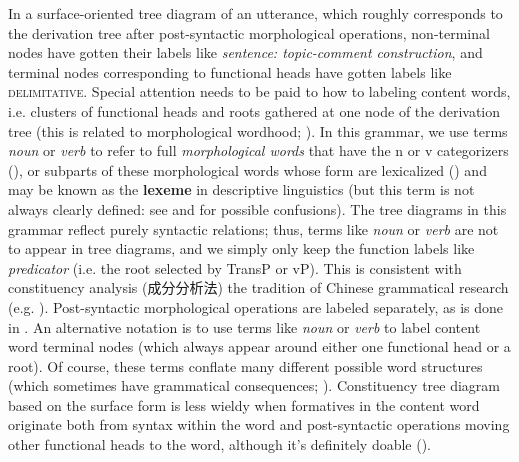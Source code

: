 \documentclass[UTF8, a4paper, oneside, scheme=plain, 12pt]{ctexrep}
\newcommand*{\citepage}[1]{p.~{#1}}
\newcommand*{\citepages}[1]{pp.~{#1}}
\newcommand*{\concept}[1]{\textbf{#1}}
\newcommand*{\term}[1]{\emph{#1}}
\newcommand*{\category}[1]{\textsc{#1}}
\begin{document}
{\begin{itemize}
    In a surface-oriented tree diagram of an utterance,
    which roughly corresponds to the derivation tree after post-syntactic morphological operations,
    non-terminal nodes have gotten their labels like \term{sentence: topic-comment construction},
    and terminal nodes corresponding to functional heads have gotten labels like \category{delimitative}.
    Special attention needs to be paid to how to labeling content words,
    i.e. clusters of functional heads and roots gathered at one node of the derivation tree
    (this is related to morphological wordhood; ).
    In this grammar, we use terms \term{noun} or \term{verb}
    to refer to full \emph{morphological words} that have the n or v categorizers
    (),
    or subparts of these morphological words  
    whose form are lexicalized () and may be known as the \concept{lexeme} in descriptive linguistics
    (but this term is not always clearly defined: see  and  for possible confusions).
    The tree diagrams in this grammar reflect purely syntactic relations;
    thus, terms like \term{noun} or \term{verb} are not to appear in tree diagrams,
    and we simply only keep the function labels like \term{predicator}
    (i.e. the root selected by TransP or vP).
    This is consistent with constituency analysis (成分分析法) the tradition of Chinese grammatical research
    (e.g. \citealt[\citepage{200}]{xianhan2004}).
    Post-syntactic morphological operations are labeled separately,
    as is done in .
    An alternative notation is to use terms like \term{noun} or \term{verb}
    to label content word terminal nodes (which always appear around either one functional head or a root).
    Of course, these terms conflate many different possible word structures
    (which sometimes have grammatical consequences; \citealt[\citepages{59-60}]{siddiqi2009syntax}).
    Constituency tree diagram based on the surface form is
    less wieldy when formatives in the content word
    originate both from syntax within the word and post-syntactic operations moving 
    other functional heads to the word,
    although it's definitely doable ().
\end{itemize}

}
\end{document}
